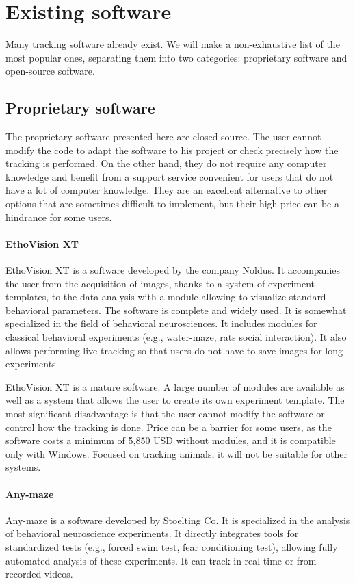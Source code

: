     \section{Existing software}
    Many tracking software already exist. We will make a non-exhaustive list of the most popular ones, separating them into two categories: proprietary software and open-source software.

    \subsection{Proprietary software}
    The proprietary software presented here are closed-source. The user cannot modify the code to adapt the software to his project or check precisely how the tracking is performed. On the other hand, they do not require any computer knowledge and benefit from a support service convenient for users that do not have a lot of computer knowledge. They are an excellent alternative to other options that are sometimes difficult to implement, but their high price can be a hindrance for some users.

    \paragraph{EthoVision XT}
    EthoVision XT is a software developed by the company Noldus. It accompanies the user from the acquisition of images, thanks to a system of experiment templates, to the data analysis with a module allowing to visualize standard behavioral parameters. The software is complete and widely used. It is somewhat specialized in the field of behavioral neurosciences. It includes modules for classical behavioral experiments (e.g., water-maze, rats social interaction). It also allows performing live tracking so that users do not have to save images for long experiments.

    EthoVision XT is a mature software. A large number of modules are available as well as a system that allows the user to create its own experiment template. The most significant disadvantage is that the user cannot modify the software or control how the tracking is done. Price can be a barrier for some users, as the software costs a minimum of 5,850 USD without modules, and it is compatible only with Windows. Focused on tracking animals, it will not be suitable for other systems.

    \paragraph{Any-maze}
    Any-maze is a software developed by Stoelting Co. It is specialized in the analysis of behavioral neuroscience experiments. It directly integrates tools for standardized tests (e.g., forced swim test, fear conditioning test), allowing fully automated analysis of these experiments. It can track in real-time or from recorded videos.

